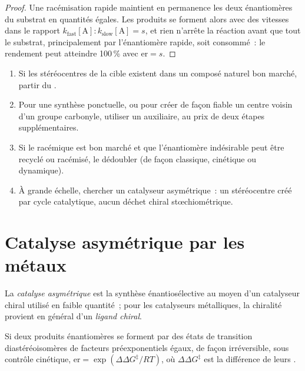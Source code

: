 \begin{proof}
Une racémisation rapide maintient en permanence les deux énantiomères du
substrat en quantités égales. Les produits se forment alors avec des vitesses dans le rapport $k_{\mathrm{fast}}[\mathrm A] : k_{\mathrm{slow}}[\mathrm A] = s$, et rien
n'arrête la réaction avant que tout le substrat, principalement par
l'énantiomère rapide, soit consommé~: le rendement peut atteindre 100\,\% avec $\mathrm{er} = s$.
\end{proof}

\begin{method}\label{met:b3:asymmetric-synthesis:strategy}
\begin{enumerate}
  \item Si les stéréocentres de la cible existent dans un composé naturel
        bon marché, partir du .
  \item Pour une synthèse ponctuelle, ou pour créer de façon fiable un
        centre voisin d'un groupe carbonyle, utiliser un auxiliaire, au prix
        de deux étapes supplémentaires.
  \item Si le racémique est bon marché et que l'énantiomère indésirable
        peut être recyclé ou racémisé, le dédoubler (de façon classique,
        cinétique ou dynamique).
  \item À grande échelle, chercher un catalyseur asymétrique~: un
        stéréocentre créé par cycle catalytique, aucun déchet chiral
        stœchiométrique.
\end{enumerate}
\end{method}

\section{Catalyse asymétrique par les métaux}

\begin{definition}\label{def:b3:asymmetric-synthesis:asymmetric-catalysis}
La \emph{catalyse asymétrique} est la synthèse
énantiosélective au moyen d'un catalyseur chiral utilisé en faible
quantité~; pour les catalyseurs métalliques, la chiralité provient en
général d'un \emph{ligand chiral}.
\end{definition}

\begin{theorem}\label{thm:b3:asymmetric-synthesis:er-ddg}
Si deux produits énantiomères se forment par des états de transition
diastéréoisomères de facteurs préexponentiels égaux, de façon irréversible,
sous contrôle cinétique,
$\mathrm{er} = \exp(\Delta\Delta G^\ddagger/RT)$, où $\Delta\Delta G^\ddagger$ est la différence de leurs .
\end{theorem}

